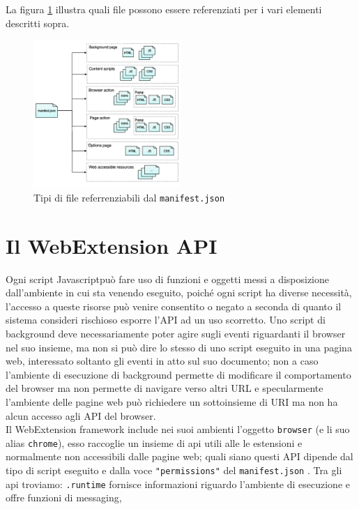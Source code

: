 \documentclass{sapthesis}
\newcommand{\code}[1]{\texttt{#1}}
\newcommand{\attr}[1]{\code{.#1}}
\newcommand{\JS}{Javascript}
\newcommand{\manifest}{\code{manifest.json} }
\begin{document}
        La figura \ref{fig:manifest-content} illustra quali file possono essere referenziati per i vari elementi descritti sopra.

        \begin{figure}[ht]
            \centering                                                  
            \includegraphics[width=0.5\textwidth]{webextension-manifest-content}
            \caption{Tipi di file referrenziabili dal \manifest }
            \label{fig:manifest-content}                             
        \end{figure}

    \section{Il WebExtension API}
    \label{webextension-api}
        Ogni script \JS può fare uso di funzioni e oggetti messi a disposizione dall'ambiente in cui sta venendo
        eseguito, poiché ogni script ha diverse necessità, l'accesso a queste risorse può venire consentito o negato
        a seconda di quanto il sistema consideri rischioso esporre l'API ad un uso scorretto. Uno script di background
        deve necessariamente poter agire sugli eventi riguardanti il browser nel suo insieme, ma non si può dire lo
        stesso di uno script eseguito in una pagina web, interessato soltanto gli eventi in atto sul suo documento;
        non a caso l'ambiente di esecuzione di background permette di modificare il comportamento del
        browser ma non permette di navigare verso altri URL e specularmente l'ambiente delle pagine web può
        richiedere un sottoinsieme di URI ma non ha alcun accesso agli API del browser.\\
        Il WebExtension framework include nei suoi ambienti l'oggetto \code{browser} (e li suo alias \code{chrome}),
        esso raccoglie un insieme di api utili alle le estensioni e normalmente non accessibili dalle pagine web;
        quali siano questi API dipende dal tipo di script eseguito e dalla voce \code{"permissions"} del \manifest.
        Tra gli api troviamo: \attr{runtime} \cite{browser-runtime} fornisce informazioni riguardo l'ambiente di 
        esecuzione e offre funzioni di messaging, 
    
\end{document}
